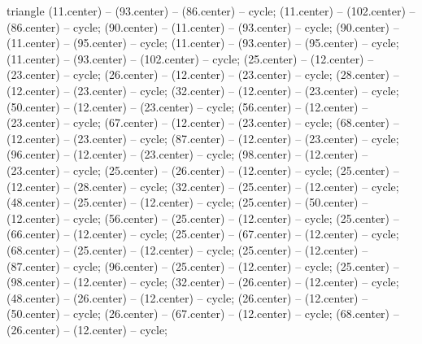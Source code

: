 \begin{pgfonlayer}{triangle}
 (11.center) -- (93.center) -- (86.center) -- cycle; 
 (11.center) -- (102.center) -- (86.center) -- cycle; 
 (90.center) -- (11.center) -- (93.center) -- cycle; 
 (90.center) -- (11.center) -- (95.center) -- cycle; 
 (11.center) -- (93.center) -- (95.center) -- cycle; 
 (11.center) -- (93.center) -- (102.center) -- cycle; 
 (25.center) -- (12.center) -- (23.center) -- cycle; 
 (26.center) -- (12.center) -- (23.center) -- cycle; 
 (28.center) -- (12.center) -- (23.center) -- cycle; 
 (32.center) -- (12.center) -- (23.center) -- cycle; 
 (50.center) -- (12.center) -- (23.center) -- cycle; 
 (56.center) -- (12.center) -- (23.center) -- cycle; 
 (67.center) -- (12.center) -- (23.center) -- cycle; 
 (68.center) -- (12.center) -- (23.center) -- cycle; 
 (87.center) -- (12.center) -- (23.center) -- cycle; 
 (96.center) -- (12.center) -- (23.center) -- cycle; 
 (98.center) -- (12.center) -- (23.center) -- cycle; 
 (25.center) -- (26.center) -- (12.center) -- cycle; 
 (25.center) -- (12.center) -- (28.center) -- cycle; 
 (32.center) -- (25.center) -- (12.center) -- cycle; 
 (48.center) -- (25.center) -- (12.center) -- cycle; 
 (25.center) -- (50.center) -- (12.center) -- cycle; 
 (56.center) -- (25.center) -- (12.center) -- cycle; 
 (25.center) -- (66.center) -- (12.center) -- cycle; 
 (25.center) -- (67.center) -- (12.center) -- cycle; 
 (68.center) -- (25.center) -- (12.center) -- cycle; 
 (25.center) -- (12.center) -- (87.center) -- cycle; 
 (96.center) -- (25.center) -- (12.center) -- cycle; 
 (25.center) -- (98.center) -- (12.center) -- cycle; 
 (32.center) -- (26.center) -- (12.center) -- cycle; 
 (48.center) -- (26.center) -- (12.center) -- cycle; 
 (26.center) -- (12.center) -- (50.center) -- cycle; 
 (26.center) -- (67.center) -- (12.center) -- cycle; 
 (68.center) -- (26.center) -- (12.center) -- cycle; 

\end{pgfonlayer}
